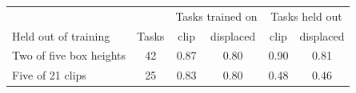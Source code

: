 \begin{tabular}{@{}lccccc@{}}
\toprule
 & & \multicolumn{2}{c}{Tasks trained on} & \multicolumn{2}{c}{Tasks held out} \\
Held out of training & Tasks & clip & displaced & clip & displaced \\
\midrule
Two of five box heights & 42 & 0.87 & 0.80 & 0.90 & 0.81 \\
Five of 21 clips & 25 & 0.83 & 0.80 & 0.48 & 0.46 \\
\bottomrule
\end{tabular}
